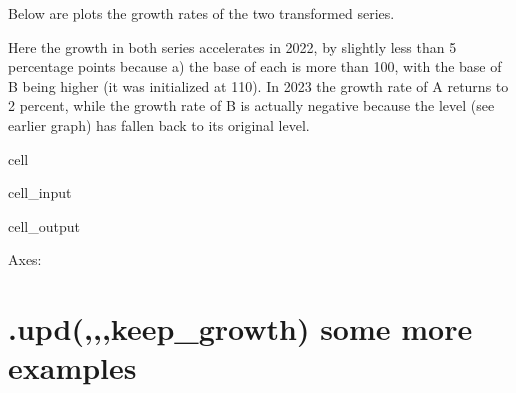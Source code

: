 \documentclass[letterpaper,10pt,english]{jupyterBook}
\begin{document}
\sphinxAtStartPar
Below are plots the growth rates of the two transformed series.

\sphinxAtStartPar
Here the growth in both series accelerates in 2022, by slightly less than 5 percentage points because a) the base of each is more than 100, with the base of B being higher (it was initialized at 110). In 2023 the growth rate of A returns to 2 percent, while the growth rate of B is actually negative because the level (see earlier graph) has fallen back to its original level.

\begin{sphinxuseclass}{cell}\begin{sphinxVerbatimInput}

\begin{sphinxuseclass}{cell_input}
\begin{sphinxVerbatim}[commandchars=\\\{\}]
\PYG{p}{[}\PYG{p}{[}\PYG{p}{]}\PYG{p}{]}
\end{sphinxVerbatim}

\end{sphinxuseclass}\end{sphinxVerbatimInput}
\begin{sphinxVerbatimOutput}

\begin{sphinxuseclass}{cell_output}
\begin{sphinxVerbatim}[commandchars=\\\{\}]
\PYGZlt{}Axes: \PYGZgt{}
\end{sphinxVerbatim}

\noindent{}

\end{sphinxuseclass}\end{sphinxVerbatimOutput}

\end{sphinxuseclass}

\section{.upd(,,,keep\_growth) some more examples}
\label{\detokenize{content/04_PythonEssentials/UpdateCommand:upd-keep-growth-some-more-examples}}
\end{document}
